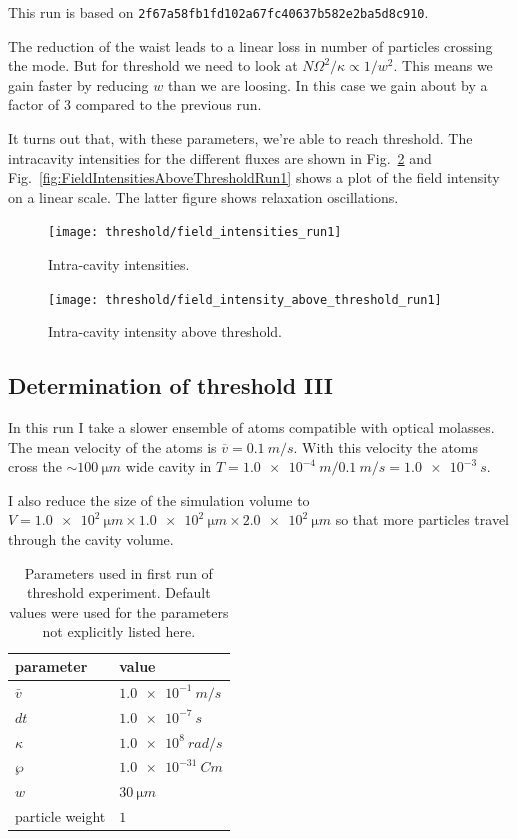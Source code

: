 \documentclass[aps, superscriptaddress, groupedaddress, preprint]{revtex4}
\newcommand\gitrevision[1]{{\tt #1}}
\begin{document}
This run is based on
\gitrevision{2f67a58fb1fd102a67fc40637b582e2ba5d8c910}.

The reduction of the waist leads to a linear loss in number of
particles crossing the mode.  But for threshold we need to look
at $N\Omega^2/\kappa\propto 1/w^2$.  This means we gain faster by
reducing $w$ than we are loosing.  In this case we gain about by
a factor of 3 compared to the previous run.

It turns out that, with these parameters, we're able to reach
threshold.  The intracavity intensities for the different fluxes
are shown in Fig.~\ref{fig:FieldIntensitiesRun1} and
Fig.~\ref{fig:FieldIntensitiesAboveThresholdRun1} shows a plot of
the field intensity on a linear scale.  The latter figure shows
relaxation oscillations.

\begin{figure}
  \texttt{[image: threshold/field\_intensities\_run1]}
  \caption{Intra-cavity intensities.\label{fig:FieldIntensitiesRun1}
  }
\end{figure}

\begin{figure}
  \texttt{[image: threshold/field\_intensity\_above\_threshold\_run1]}
  \caption{Intra-cavity intensity above
    threshold.\label{fig:FieldIntensitiesRun1}}
\end{figure}


\subsection{Determination of threshold III}

In this run I take a slower ensemble of atoms compatible with
optical molasses.  The mean velocity of the atoms is
$\overbar{v}=\SI{0.1}{m/s}$.  With this velocity the atoms cross
the $\sim\SI{100}{\micro m}$ wide cavity in
$T=\SI{1.0e-4}{m}/\SI{0.1}{m/s}=\SI{1.0e-3}{s}$.

I also reduce the size of the simulation volume to
$V=\SI{1.0e2}{\micro m}\times\SI{1.0e2}{\micro m}\times
\SI{2.0e2}{\micro m}$ so that more particles travel through the
cavity volume.

\begin{table}
  \begin{tabular}{|l|l|}
    \hline
    parameter       & value\\
    \hline
    \hline
    $\bar v$        & $\SI{1.0e-1}{m/s}$\\
    \hline
    $dt$            & $\SI{1.0e-7}{s}$\\
    \hline
    $\kappa$        & $\SI{1.0e8}{rad/s}$\\
    \hline
    $\wp$           & $\SI{1.0e-31}{Cm}$\\
    \hline
    $w$             & $\SI{30}{\micro m}$\\
    \hline
    particle weight & $1$\\
    \hline
  \end{tabular}
  \caption{Parameters used in first run of threshold experiment.
    Default values were used for the parameters not explicitly
    listed here.}
  \label{tab:Run2Params}
\end{table}
\end{document}
